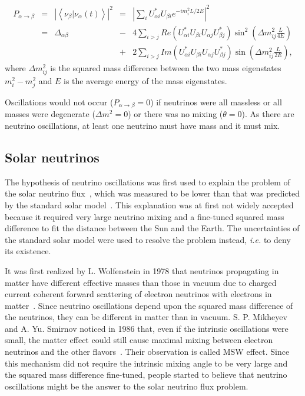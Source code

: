 \begin{equation}
  \label{eq:pa2b}
  \begin{array}{ccccl}
    P_{\alpha \rightarrow \beta} &=& \left| \left\langle                 \nu_{\beta}|\nu_{\alpha}(t) \right\rangle \right|^{2} &=&     {\displaystyle \left|       \sum_{i}U_{\alpha i}^{*}U_{\beta i}e^{-i           m_{i}^2 L/2E} \right|^{2}}\\ &=& \Delta_{\alpha\beta} &-&     4{\displaystyle \sum_{i>j}Re(U_{\alpha         i}^{*}U_{\beta         i}U_{\alpha j}U_{\beta j}^{*})\sin^{2}(\Delta     m_{ij}^{2}       \frac{L}{4E})}\\ & & &+& {\displaystyle 2\sum_{i>j}Im(U_{\alpha         i}^{*}U_{\beta i}U_{\alpha j}U_{\beta j}^{*})\sin(\Delta       m_{ij}^{2}\frac{L}{2E})},
  \end{array}
\end{equation}
where $\Delta m^{2}_{ij}$ is the squared mass difference between the
two mass eigenstates $m^{2}_{i} - m^{2}_{j}$ and $E$ is the
average energy of the mass eigenstates.

Oscillations would not occur ($P_{\alpha \rightarrow \beta} = 0$) if neutrinos were all massless or all masses were degenerate ($\Delta m^{2} = 0$) or there was no mixing ($\theta = 0$). As there are neutrino oscillations, at least one neutrino must have mass and it must mix.

\subsection{Solar neutrinos}
\label{sec:solar}
The hypothesis of neutrino oscillations was first used to explain the problem of the solar neutrino flux~\cite{Dav64,Dav68}, which was measured to be lower than that was predicted by the standard solar model~\cite{Bah98}. This explanation was at first not widely accepted because it required very large neutrino mixing and a fine-tuned squared mass difference to fit the distance between the Sun and the Earth. The uncertainties of the standard solar model were used to resolve the problem instead, \textit{i.e.} to deny its existence.

It was first realized by L. Wolfenstein in 1978 that neutrinos propagating in matter have different effective masses than those in vacuum due to charged current coherent forward scattering of electron neutrinos with electrons in matter~\cite{Wol78}. Since neutrino oscillations depend upon the squared mass difference of the neutrinos, they can be different in matter than in vacuum. S. P. Mikheyev and A. Yu. Smirnov noticed in 1986 that, even if the intrinsic oscillations were small, the matter effect could still cause maximal mixing between electron neutrinos and the other flavors~\cite{Mik86}. Their observation is called MSW effect. Since this mechanism did not require the intrinsic mixing angle to be very large and the squared mass difference fine-tuned, people started to believe that neutrino oscillations might be the answer to the solar neutrino flux problem.

